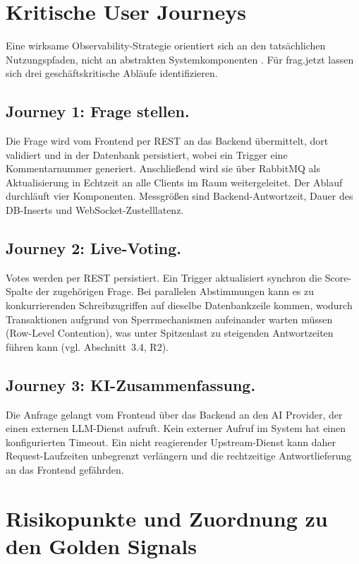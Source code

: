 \section{Kritische User Journeys}

Eine wirksame Observability-Strategie orientiert sich an den tatsächlichen Nutzungspfaden, nicht an abstrakten Systemkomponenten \parencite[S.~10--11]{Niedermaier2019onObservability}. Für frag.jetzt lassen sich drei geschäftskritische Abläufe identifizieren.

\subsection{Journey 1: Frage stellen.}
Die Frage wird vom Frontend per REST an das Backend übermittelt, dort validiert und in der Datenbank persistiert, wobei ein Trigger eine Kommentarnummer generiert. Anschließend wird sie über RabbitMQ als Aktualisierung in Echtzeit an alle Clients im Raum weitergeleitet. Der Ablauf durchläuft vier Komponenten. Messgrößen sind Backend-Antwortzeit, Dauer des DB-Inserts und WebSocket-Zustelllatenz.

\subsection{Journey 2: Live-Voting.}
Votes werden per REST persistiert. Ein Trigger aktualisiert synchron die Score-Spalte der zugehörigen Frage. Bei parallelen Abstimmungen kann es zu konkurrierenden Schreibzugriffen auf dieselbe Datenbankzeile kommen, wodurch Transaktionen aufgrund von Sperrmechanismen aufeinander warten müssen (Row-Level Contention), was unter Spitzenlast zu steigenden Antwortzeiten führen kann (vgl. Abschnitt~3.4, R2).

\subsection{Journey 3: KI-Zusammenfassung.}
Die Anfrage gelangt vom Frontend über das Backend an den AI Provider, der einen externen LLM-Dienst aufruft. Kein externer Aufruf im System hat einen konfigurierten Timeout. Ein nicht reagierender Upstream-Dienst kann daher Request-Laufzeiten unbegrenzt verlängern und die rechtzeitige Antwortlieferung an das Frontend gefährden.


\section{Risikopunkte und Zuordnung zu den Golden Signals}

